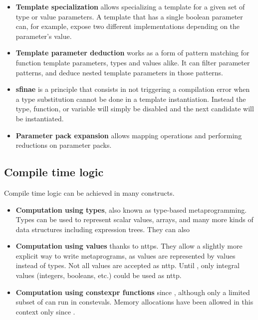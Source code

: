 \documentclass[../main]{subfiles}
\begin{document}
\begin{itemize}
  \item

\textbf{Template specialization} allows specializing a template for a given
set of type or value parameters. A template that has a single boolean parameter
can, for example, expose two different implementations depending on the
parameter's value.

  \item

\textbf{Template parameter deduction} works as a form of pattern matching
for function template parameters, types and values alike. It can filter
parameter patterns, and deduce nested template parameters in those patterns.

  \item

\textbf{\gls{sfinae}} is a \cpp principle that consists in not triggering a
compilation error when a type substitution cannot be done in a template
instantiation. Instead the type, function, or variable will simply be disabled
and the next candidate will be instantiated.

  \item

\textbf{Parameter pack expansion} allows mapping operations and performing
reductions on parameter packs.

\end{itemize}

\subsection{
  Compile time logic
}

Compile time logic can be achieved in many \cpp constructs.

\begin{itemize}

  \item

\textbf{Computation using types}, also known as type-based metaprogramming.
Types can be used to represent scalar values, arrays, and many more
kinds of data structures including expression trees. They can also

  \item

\textbf{Computation using values} thanks to \glspl{nttp}.
They allow a slightly more explicit way to write metaprograms,
as values are represented by values instead of types.
Not all values are accepted as \gls{nttp}.
Until , only integral values (\ie integers, booleans, etc.)
could be used as \gls{nttp}.

  \item

\textbf{Computation using \gls{constexpr} functions} since ,
although only a limited subset of \cpp can run in \glspl{consteval}.
Memory allocations have been allowed in this context only since .

\end{itemize}
\end{document}
